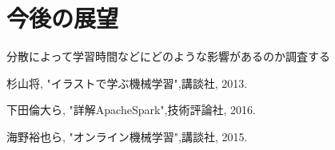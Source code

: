 \documentclass[a4paper,12pt]{jarticle}
\begin{document}
\section{今後の展望}
分散によって学習時間などにどのような影響があるのか調査する

\begin{thebibliography}{99}

  杉山将,
		 "イラストで学ぶ機械学習",講談社, 2013.

 下田倫大ら,
		"詳解ApacheSpark",技術評論社, 2016.

  海野裕也ら,
		 "オンライン機械学習",講談社, 2015.

\end{thebibliography}
\end{document}
